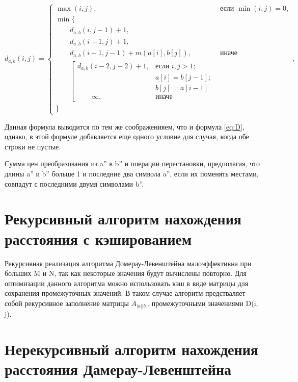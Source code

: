 \begin{equation}
    \label{eq:d}
    d_{a,b}(i, j) = \begin{cases}
        \max(i, j), &\text{если }\min(i, j) = 0,\\
        \min \lbrace \\
        \qquad d_{a,b}(i, j-1) + 1,\\
        \qquad d_{a,b}(i-1, j) + 1,\\
        \qquad d_{a,b}(i-1, j-1) + m(a[i], b[j]), &\text{иначе}\\
        \qquad \left[ \begin{array}{cc}d_{a,b}(i-2, j-2) + 1, &\text{если }i,j > 1;\\
        \qquad &\text{}a[i] = b[j-1]; \\
        \qquad &\text{}b[j] = a[i-1]\\
        \qquad \infty, & \text{иначе}\end{array}\right.\\
        \rbrace
    \end{cases},
\end{equation}

Данная формула выводится по тем же соображенияем, что и формула \ref{eq:D}, однако, 
в этой формуле добавляется еще одного условие для случая, когда обе строки не пустые. 

Сумма цен преобразования из a'' в b'' и операции перестановки, предполагая, что 
длины a'' и  b'' больше 1 и последние два символа a'', если их поменять местами, совпадут
с последними двумя символами b''.

\section{Рекурсивный алгоритм нахождения расстояния с кэшированием}

Рекурсивная реализация алгоритма Домерау-Левенштейна малоэффективна при больших M и N, 
так как некоторые значения будут вычислены повторно. Для оптимизации данного алгоритма 
можно использовать кэш в виде матрицы для сохранения промежуточных значений.
В таком случае алгоритм предстваляет собой рекурсивное заполнение матрицы $A_{|a||b|}$.
промежуточными значениями D(i, j).

\section{Нерекурсивный алгоритм нахождения расстояния Дамерау-Левенштейна}

